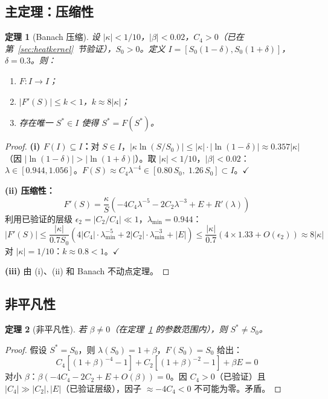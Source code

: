 \documentclass[11pt,a4paper]{ctexart}
\newtheorem{theorem}{定理}[section]
\theoremstyle{remark}
\begin{document}
\subsection{主定理：压缩性}

\begin{theorem}[Banach 压缩]
\label{thm:contraction}
设 $|\kappa| < 1/10$，$|\beta| < 0.02$，$C_4 > 0$（已在第~\ref{sec:heatkernel}~节验证），$S_0 > 0$。定义 $I = [S_0(1-\delta), S_0(1+\delta)]$，$\delta = 0.3$。则：
\begin{enumerate}
  \item $F: I \to I$；
  \item $|F'(S)| \leq k < 1$，$k \approx 8|\kappa|$；
  \item 存在唯一 $S^* \in I$ 使得 $S^* = F(S^*)$。
\end{enumerate}
\end{theorem}

\begin{proof}
\textbf{(i) $F(I) \subseteq I$：}对 $S \in I$，$|\kappa \ln(S/S_0)| \leq |\kappa| \cdot |\ln(1-\delta)| \approx 0.357|\kappa|$（因 $|\ln(1-\delta)| > |\ln(1+\delta)|$）。取 $|\kappa| < 1/10$，$|\beta| < 0.02$：$\lambda \in [0.944, 1.056]$。$F(S) \approx C_4 \lambda^{-4} \in [0.80\, S_0,\; 1.26\, S_0] \subset I$。$\checkmark$

\textbf{(ii) 压缩性：}
\[
  F'(S) = \frac{\kappa}{S}\left(-4C_4\lambda^{-5} - 2C_2\lambda^{-3} + E + R'(\lambda)\right)
\]
利用已验证的层级 $\epsilon_2 = |C_2/C_4| \ll 1$，$\lambda_{\min} = 0.944$：
\[
  |F'(S)| \leq \frac{|\kappa|}{0.7 S_0}\left(4|C_4| \cdot \lambda_{\min}^{-5} + 2|C_2| \cdot \lambda_{\min}^{-3} + |E|\right) \leq \frac{|\kappa|}{0.7}\left(4 \times 1.33 + O(\epsilon_2)\right) \approx 8|\kappa|
\]
对 $|\kappa| = 1/10$：$k \approx 0.8 < 1$。$\checkmark$

\textbf{(iii)} 由 (i)、(ii) 和 Banach 不动点定理。
\end{proof}

\subsection{非平凡性}

\begin{theorem}[非平凡性]
\label{thm:nontrivial}
若 $\beta \neq 0$（在定理~\ref{thm:contraction} 的参数范围内），则 $S^* \neq S_0$。
\end{theorem}

\begin{proof}
假设 $S^* = S_0$，则 $\lambda(S_0) = 1 + \beta$，$F(S_0) = S_0$ 给出：
\[
  C_4[(1+\beta)^{-4}-1] + C_2[(1+\beta)^{-2}-1] + \beta E = 0
\]
对小 $\beta$：$\beta(-4C_4 - 2C_2 + E + O(\beta)) = 0$。因 $C_4 > 0$（已验证）且 $|C_4| \gg |C_2|, |E|$（已验证层级），因子 $\approx -4C_4 < 0$ 不可能为零。矛盾。
\end{proof}
\end{document}
